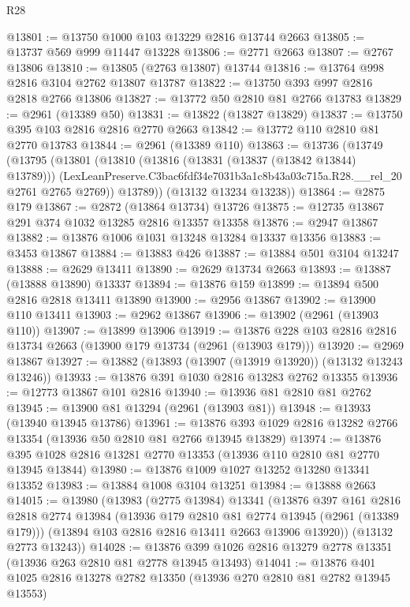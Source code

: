 \begin{lexlean}{R28}
\begin{coremodule}
@13801 := @13750 @1000 @103 @13229 @2816 @13744 @2663
@13805 := @13737 @569 @999 @11447 @13228
@13806 := @2771 @2663
@13807 := @2767 @13806
@13810 := @13805 (@2763 @13807) @13744
@13816 := @13764 @998 @2816 @3104 @2762 @13807 @13787
@13822 := @13750 @393 @997 @2816 @2818 @2766 @13806
@13827 := @13772 @50 @2810 @81 @2766 @13783
@13829 := @2961 (@13389 @50)
@13831 := @13822 (@13827 @13829)
@13837 := @13750 @395 @103 @2816 @2816 @2770 @2663
@13842 := @13772 @110 @2810 @81 @2770 @13783
@13844 := @2961 (@13389 @110)
@13863 := @13736
    (@13749
      (@13795
        (@13801
          (@13810
            (@13816 (@13831 (@13837 (@13842 @13844) @13789)))
            (LexLeanPreserve.C3bac6fdf34e7031b3a1c8b43a03c715a.R28.__rel_20 @2761 @2765 @2769))
          @13789))
      (@13132 @13234 @13238))
@13864 := @2875 @179
@13867 := @2872 (@13864 @13734) @13726
@13875 := @12735 @13867 @291 @374 @1032 @13285 @2816 @13357 @13358
@13876 := @2947 @13867
@13882 := @13876 @1006 @1031 @13248 @13284 @13337 @13356
@13883 := @3453 @13867
@13884 := @13883 @426
@13887 := @13884 @501 @3104 @13247
@13888 := @2629 @13411
@13890 := @2629 @13734 @2663
@13893 := @13887 (@13888 @13890) @13337
@13894 := @13876 @159
@13899 := @13894 @500 @2816 @2818 @13411 @13890
@13900 := @2956 @13867
@13902 := @13900 @110 @13411
@13903 := @2962 @13867
@13906 := @13902 (@2961 (@13903 @110))
@13907 := @13899 @13906
@13919 := @13876 @228 @103 @2816 @2816 @13734 @2663 (@13900 @179 @13734 (@2961 (@13903 @179)))
@13920 := @2969 @13867
@13927 := @13882 (@13893 (@13907 (@13919 @13920)) (@13132 @13243 @13246))
@13933 := @13876 @391 @1030 @2816 @13283 @2762 @13355
@13936 := @12773 @13867 @101 @2816
@13940 := @13936 @81 @2810 @81 @2762
@13945 := @13900 @81 @13294 (@2961 (@13903 @81))
@13948 := @13933 (@13940 @13945 @13786)
@13961 := @13876 @393 @1029 @2816 @13282 @2766 @13354 (@13936 @50 @2810 @81 @2766 @13945 @13829)
@13974 := @13876 @395 @1028 @2816 @13281 @2770 @13353 (@13936 @110 @2810 @81 @2770 @13945 @13844)
@13980 := @13876 @1009 @1027 @13252 @13280 @13341 @13352
@13983 := @13884 @1008 @3104 @13251
@13984 := @13888 @2663
@14015 := @13980
    (@13983
      (@2775 @13984)
      @13341
      (@13876
        @397
        @161
        @2816
        @2818
        @2774
        @13984
        (@13936 @179 @2810 @81 @2774 @13945 (@2961 (@13389 @179)))
        (@13894 @103 @2816 @2816 @13411 @2663 @13906 @13920))
      (@13132 @2773 @13243))
@14028 := @13876 @399 @1026 @2816 @13279 @2778 @13351 (@13936 @263 @2810 @81 @2778 @13945 @13493)
@14041 := @13876 @401 @1025 @2816 @13278 @2782 @13350 (@13936 @270 @2810 @81 @2782 @13945 @13553)

\end{coremodule}
\end{lexlean}
